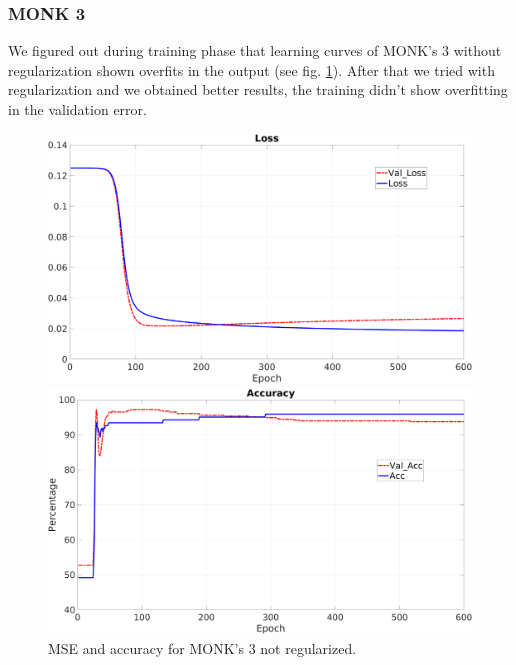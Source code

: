 \subsubsection{MONK 3}
We figured out during training phase that learning curves of MONK's 3 without regularization shown overfits in the output (see fig. \ref{fig:m3nr}). After that we tried with regularization and we obtained better results, the training didn't show overfitting in the validation error.
\begin{figure}[H]
    \centering
    \begin{minipage}[t]{0.5\linewidth}
        \includegraphics[width=\linewidth]{img/Monk3_loss_noReg.png}

    \end{minipage}%
    \begin{minipage}[t]{0.5\linewidth}
        \includegraphics[width=\linewidth]{img/Monk3_accuracy_noReg.png}
    \end{minipage}
    \caption{MSE and accuracy for MONK’s 3 not regularized.}
    \label{fig:m3nr}
\end{figure}

